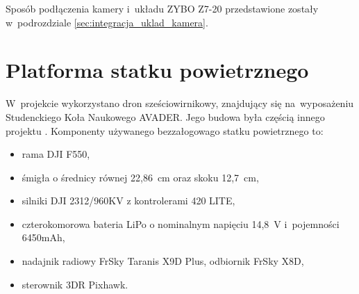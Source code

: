 
Sposób podłączenia kamery i~układu ZYBO Z7-20 przedstawione zostały w~podrozdziale \ref{sec:integracja_uklad_kamera}.

\section{Platforma statku powietrznego}
\label{sec:platforma_statku_powietrznego}

W~projekcie wykorzystano dron sześciowirnikowy, znajdujący się na~wyposażeniu Studenckiego Koła Naukowego AVADER. 
Jego budowa była częścią innego projektu \cite{mgr}. 
Komponenty używanego bezzałogowago statku powietrznego to:
\begin{itemize}
	\item rama DJI F550,
	\item śmigła o średnicy równej 22,86~cm oraz skoku 12,7~cm,
	\item silniki DJI 2312/960KV z kontrolerami 420 LITE,
	\item czterokomorowa bateria LiPo o nominalnym napięciu 14,8~V i~pojemności 6450mAh, 
	\item nadajnik radiowy FrSky Taranis X9D Plus, odbiornik FrSky X8D,
	\item sterownik 3DR Pixhawk.
\end{itemize}

